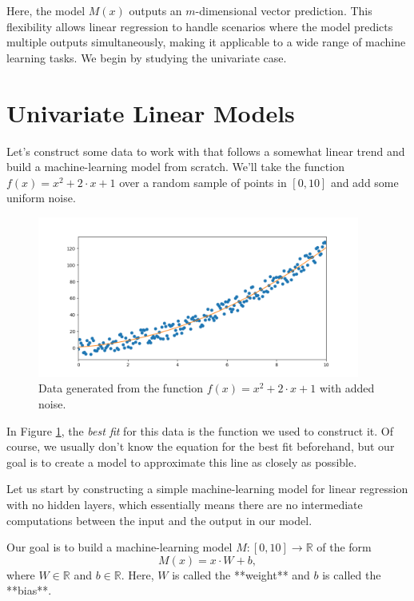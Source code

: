 Here, the model $M(x)$ outputs an $m$-dimensional vector prediction. This flexibility allows linear regression to handle scenarios where the model predicts multiple outputs simultaneously, making it applicable to a wide range of machine learning tasks. We begin by studying the univariate case.

\section{Univariate Linear Models}
\label{sec:2}
Let's construct some data to work with that follows a somewhat linear trend and build a machine-learning model from scratch. We'll take the function $f(x)=x^2+2\cdot x+1$ over a random sample of points in $[0,10]$ and add some uniform noise.



\begin{figure}[H]
\centering
\includegraphics[width=300pt]{Regression/code/fig1.png}
\caption{Data generated from the function $f(x)=x^2+2\cdot x+1$ with added noise.}
\label{fig:linear1}
\end{figure}

In Figure \ref{fig:linear1}, the \textit{best fit} for this data is the function we used to construct it. Of course, we usually don't know the equation for the best fit beforehand, but our goal is to create a model to approximate this line as closely as possible. 

Let us start by constructing a simple machine-learning model for linear regression with no hidden layers, which essentially means there are no intermediate computations between the input and the output in our model.

Our goal is to build a machine-learning model 
$M:[0,10]\to\mathbb{R}$ of the form $$M(x) = x \cdot W + b,$$ where $W\in\mathbb{R}$ and $b\in\mathbb{R}$. Here, $W$ is called the **weight** and $b$ is called the **bias**.   

